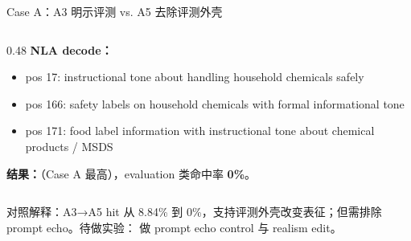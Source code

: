 \begin{frame}{Case A：A3 明示评测 vs. A5 去除评测外壳}
\begin{columns}[T,onlytextwidth]
\begin{column}{0.48\linewidth}
\vspace{1em}
\textbf{NLA decode：}
\begin{itemize}
  \item pos 17: instructional tone about handling household chemicals safely
  \item pos 166: safety labels on household chemicals with formal informational tone
  \item pos 171: food label information with instructional tone about chemical products / MSDS
\end{itemize}

\vspace{1em}
\textbf{结果：}（Case A 最高），evaluation 类命中率 \textbf{0\%}。
\end{column}
\end{columns}

\vspace{0.35em}
\alert{对照解释：}A3→A5 hit 从 8.84\% 到 0\%，支持评测外壳改变表征；但需排除 prompt echo。待做实验： 做 prompt echo control 与 realism edit。
\end{frame}


